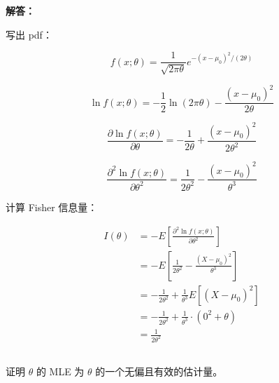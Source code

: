 \documentclass[12pt,a4paper]{article}
\begin{document}
\begin{answerbox}
\textbf{解答：}

写出 pdf：

$$
f(x; \theta) = \frac{1}{\sqrt{2\pi \theta}} e^{-(x-\mu_0)^2/(2\theta)}
$$

$$
\ln f(x; \theta) = -\frac{1}{2} \ln (2\pi \theta) - \frac{(x-\mu_0)^2}{2\theta}
$$

$$
\frac{\partial \ln f(x; \theta)}{\partial \theta} = -\frac{1}{2\theta} + \frac{(x-\mu_0)^2}{2\theta^2}
$$

$$
\frac{\partial^2 \ln f(x; \theta)}{\partial \theta^2} = \frac{1}{2\theta^2} - \frac{(x-\mu_0)^2}{\theta^3}
$$

计算 Fisher 信息量：

$$
\begin{aligned}
I(\theta) &= -E\left[\frac{\partial^2 \ln f(x; \theta)}{\partial \theta^2}\right] \\
&= -E\left[\frac{1}{2\theta^2} - \frac{(X-\mu_0)^2}{\theta^3}\right] \\
&= -\frac{1}{2\theta^2} + \frac{1}{\theta^3} E[(X-\mu_0)^2] \\
&= -\frac{1}{2\theta^2} + \frac{1}{\theta^3} \cdot (0^2 + \theta) \\
&= \frac{1}{2\theta^2}
\end{aligned}
$$

\end{answerbox}

\subsection{}

证明 $\theta$ 的 MLE 为 $\theta$ 的一个无偏且有效的估计量。
\end{document}
